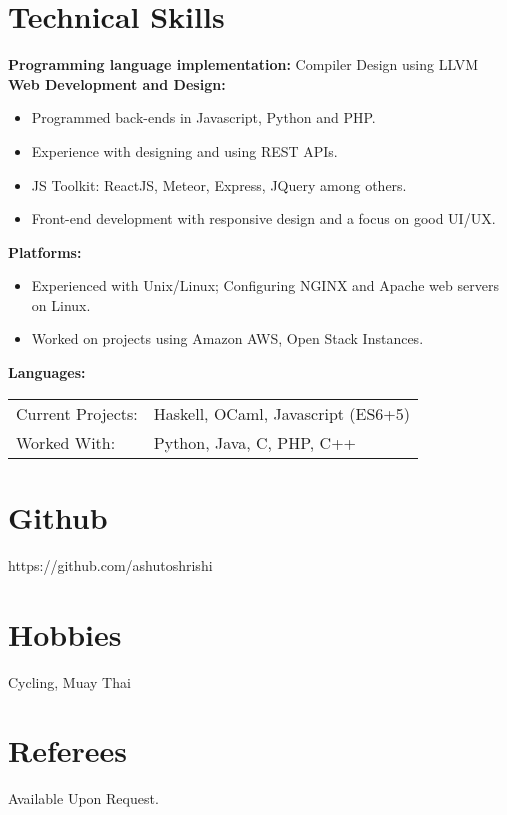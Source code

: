\documentclass[overlapped]{res}
\begin{document}
\begin{resume}
  \section{Technical Skills} 
  \textbf{Programming language implementation:} Compiler Design using LLVM \\
  \textbf{Web Development and Design:}
  \begin{itemize}
  \item Programmed back-ends in Javascript, Python and PHP.
  \item Experience with designing and using REST APIs.
  \item JS Toolkit: ReactJS, Meteor, Express, JQuery among
    others.
  \item Front-end development with responsive design and a focus on good UI/UX.
  \end{itemize}
  \textbf{Platforms:}
  \begin{itemize}
  \item Experienced with Unix/Linux; Configuring NGINX and Apache web servers on
    Linux.
  \item Worked on projects using Amazon AWS, Open Stack Instances. 
  \end{itemize}
  \textbf{Languages:} \\ 
  \begin{tabular}{l l}
    Current Projects: & Haskell, OCaml, Javascript (ES6+5) \\ 
    Worked With: & Python, Java, C, PHP, C++
  \end{tabular}


  \section{Github} 
  https://github.com/ashutoshrishi 
  \section{Hobbies}
  Cycling, Muay Thai
  
  \section{Referees}
  Available Upon Request.
  
  
\end{resume}
\end{document}
